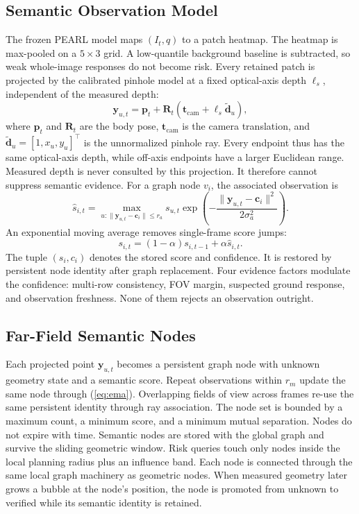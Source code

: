 \documentclass[letterpaper,10pt,conference]{ieeeconf}
\newcommand{\vect}[1]{\boldsymbol{#1}}
\newcommand{\mat}[1]{\mathbf{#1}}
\begin{document}
\subsection{Semantic Observation Model}
The frozen PEARL model maps $(I_t,q)$ to a patch heatmap.
The heatmap is max-pooled on a $5\times3$ grid. A low-quantile background
baseline is subtracted, so weak whole-image responses do not become risk.
Every retained patch is projected by the calibrated pinhole model at a fixed
optical-axis depth $\ell_s$, independent of the measured depth:
\begin{equation}
 \vect{y}_{u,t}=\vect{p}_t+\mat{R}_t
 \left(\vect{t}_{\mathrm{cam}}+\ell_s\widetilde{\vect{d}}_u\right),
\label{eq:projection}
\end{equation}
where $\vect{p}_t$ and $\mat{R}_t$ are the body pose,
$\vect{t}_{\mathrm{cam}}$ is the camera translation, and
$\widetilde{\vect{d}}_u=[1,x_u,y_u]^\top$ is the unnormalized pinhole ray.
Every endpoint thus has the same optical-axis depth, while off-axis endpoints
have a larger Euclidean range. Measured depth is never consulted by this
projection. It therefore cannot suppress semantic evidence.
For a graph node $v_i$, the associated observation is
\begin{equation}
 \hat{s}_{i,t}=
 \max_{u:\|\vect{y}_{u,t}-\vect{c}_i\|\le r_a}
 s_{u,t}
 \exp\left(-\frac{\|\vect{y}_{u,t}-\vect{c}_i\|^2}{2\sigma_a^2}\right).
\label{eq:association}
\end{equation}
An exponential moving average removes single-frame score jumps:
\begin{equation}
 s_{i,t}=(1-\alpha)s_{i,t-1}+\alpha\hat{s}_{i,t}.
\label{eq:ema}
\end{equation}
The tuple $(s_i,c_i)$ denotes the stored score and confidence. It is restored
by persistent node identity after graph replacement.
Four evidence factors modulate the confidence: multi-row consistency, FOV
margin, suspected ground response, and observation freshness. None of them
rejects an observation outright.

\subsection{Far-Field Semantic Nodes}
Each projected point $\vect{y}_{u,t}$ becomes a persistent graph node with
unknown geometry state and a semantic score.
Repeat observations within $r_m$ update the same node through
(\ref{eq:ema}). Overlapping fields of view across frames re-use the same
persistent identity through ray association.
The node set is bounded by a maximum count, a minimum score, and a minimum
mutual separation. Nodes do not expire with time.
Semantic nodes are stored with the global graph and survive the sliding
geometric window. Risk queries touch only nodes inside the local planning
radius plus an influence band.
Each node is connected through the same local graph machinery as geometric
nodes. When measured geometry later grows a bubble at the node's position,
the node is promoted from unknown to verified while its semantic identity is
retained.
\end{document}

